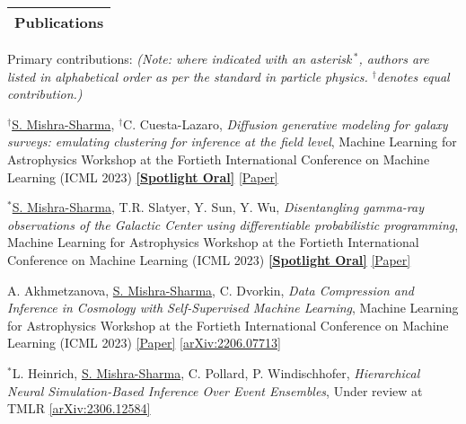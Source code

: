 \documentclass[letterpaper,11pt]{article}
\newenvironment{packed_enumerate}[1][]{
\begin{etaremune}[#1]
  \setlength{\itemsep}{3.7pt}
  \setlength{\parskip}{0pt}
  \setlength{\parsep}{0pt}}{\end{etaremune}
}
\begin{document}


\noindent
\begin{tabular*}{\textwidth}{l@{\extracolsep{\fill}}}
\large {\sc \Large{Publications}}\\
\hline
\end{tabular*}\vspace{3.5mm}

\noindent
Primary contributions: \emph{(Note: where indicated with an asterisk\,$^*$, authors are listed in alphabetical order as per the standard in particle physics. $^{\dagger}$denotes equal contribution.)}

\begin{packed_enumerate}[start=37]

  \item $^{\dagger}$\underline{S. Mishra-Sharma}, $^{\dagger}$C. Cuesta-Lazaro, \emph{Diffusion generative modeling for galaxy surveys: emulating clustering for inference at the field level}, {Machine Learning for Astrophysics Workshop at the Fortieth International Conference on Machine Learning (ICML 2023)} \href{https://ml4astro.github.io/icml2023/}{\textbf{[Spotlight Oral]}} \href{https://ml4astro.github.io/icml2023/assets/59.pdf}{[Paper]}

  \item $^*$\underline{S. Mishra-Sharma}, T.R. Slatyer, Y. Sun, Y. Wu, \emph{Disentangling gamma-ray observations of the Galactic Center using differentiable probabilistic programming}, {Machine Learning for Astrophysics Workshop at the Fortieth International Conference on Machine Learning (ICML 2023)} \href{https://ml4astro.github.io/icml2023/}{\textbf{[Spotlight Oral]}} \href{https://ml4astro.github.io/icml2023/assets/52.pdf}{[Paper]}

  \item A. Akhmetzanova, \underline{S. Mishra-Sharma}, C. Dvorkin, \emph{Data Compression and Inference in Cosmology with Self-Supervised Machine Learning}, {Machine Learning for Astrophysics Workshop at the Fortieth International Conference on Machine Learning (ICML 2023)} \href{https://ml4astro.github.io/icml2023/assets/11.pdf}{[Paper]} \href{https://arxiv.org/abs/2206.07713}{[arXiv:2206.07713]}

  \item $^*$L. Heinrich, \underline{S. Mishra-Sharma}, C. Pollard, P. Windischhofer, \emph{Hierarchical Neural Simulation-Based Inference Over Event Ensembles}, Under review at TMLR \href{https://arxiv.org/abs/2306.12584}{[arXiv:2306.12584]}
  

\end{packed_enumerate}
\end{document}
